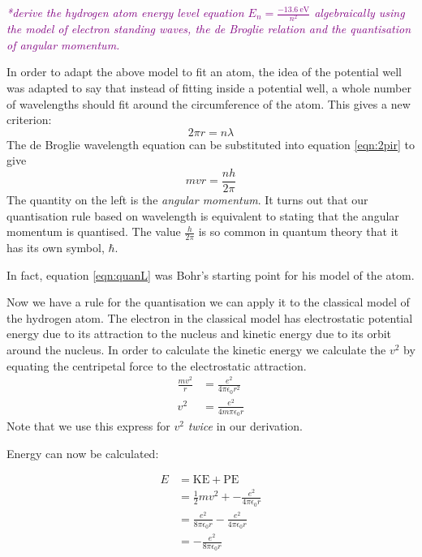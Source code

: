 \documentclass[main.tex]{subfiles}
\renewcommand{\spec}[1]{\refstepcounter{spec}\Needspace{5\baselineskip}\textcolor{purple}{\textit{#1}}}
\begin{document}
\spec{*derive the hydrogen atom energy level equation
$E_n = \frac{\SI{-13.6}{\electronvolt}}{n^2}$ algebraically using the model of electron standing waves, the de Broglie relation and the quantisation of angular momentum.
}

In order to adapt the above model to fit an atom, the idea of the potential well was adapted to say that instead of fitting inside a potential well, a whole number of wavelengths should fit around the circumference of the atom. This gives a new criterion:
\begin{equation}\label{eqn:2pir}
  2\pi r = n\lambda
\end{equation}
The de Broglie wavelength equation can be substituted into equation \ref{eqn:2pir} to give
\begin{equation}\label{eqn:quanL}
  mvr = \frac{nh}{2\pi}
\end{equation}
The quantity on the left is the \emph{angular momentum}. It turns out that our quantisation rule based on wavelength is equivalent to stating that the angular momentum is quantised. The value $\frac{h}{2\pi}$ is so common in quantum theory that it has its own symbol, $\hbar$.

In fact, equation \ref{eqn:quanL} was Bohr's starting point for his model of the atom.

Now we have a rule for the quantisation we can apply it to the classical model of the hydrogen atom. The electron in the classical model has electrostatic potential energy due to its attraction to the nucleus and kinetic energy due to its orbit around the nucleus. In order to calculate the kinetic energy we calculate the $v^2$ by equating the centripetal force to the electrostatic attraction.
\begin{align}
\frac{mv^2}{r} &= \frac{e^2}{4\pi\epsilon_0 r^2} \nonumber \\
v^2 &= \frac{e^2}{4m\pi\epsilon_0 r}\label{eqn:v2}
\end{align}
Note that we use this express for $v^2$ \emph{twice} in our derivation.

Energy can now be calculated:

\begin{align}
  E &= \text{KE} + \text{PE}\nonumber \\
  &= \frac{1}{2}mv^2 + -\frac{e^2}{4\pi\epsilon_0 r}\label{eqn:e1}\\
  &= \frac{e^2}{8\pi\epsilon_0 r} - \frac{e^2}{4\pi\epsilon_0 r} \nonumber \\
  &= -\frac{e^2}{8\pi\epsilon_0 r}\label{eqn:e}
\end{align}
\end{document}

